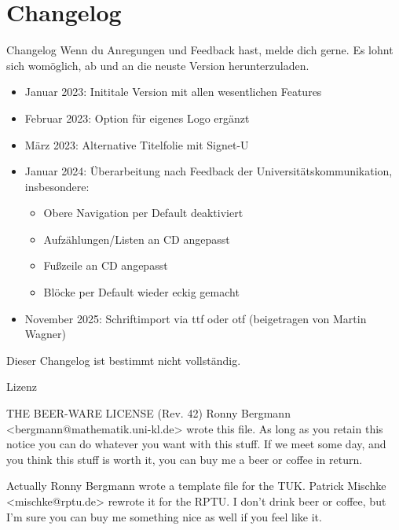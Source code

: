 \documentclass[german,10pt,compress]{beamer}
\begin{document}
\section{Changelog}
\begin{frame}{Changelog}
	Wenn du Anregungen und Feedback hast, melde dich gerne. Es lohnt sich womöglich, ab und an die neuste Version herunterzuladen.
	\begin{itemize}
		\item Januar 2023: Inititale Version mit allen wesentlichen Features
		\item Februar 2023: Option für eigenes Logo ergänzt
		\item März 2023: Alternative Titelfolie mit Signet-U
		\item Januar 2024: Überarbeitung nach Feedback der Universitätskommunikation, insbesondere:
		      \begin{itemize}
			      \item Obere Navigation per Default deaktiviert
			      \item Aufzählungen/Listen an CD angepasst
			      \item Fußzeile an CD angepasst
			      \item Blöcke per Default wieder eckig gemacht
		      \end{itemize}
		\item November 2025: Schriftimport via ttf oder otf (beigetragen von Martin Wagner)
	\end{itemize}
	Dieser Changelog ist bestimmt nicht vollständig.
\end{frame}
\begin{frame}{Lizenz}
	\begin{block}{THE BEER-WARE LICENSE (Rev. 42)}
		Ronny Bergmann <bergmann@mathematik.uni-kl.de> wrote this file. As long as
		you retain this notice you can do whatever you want with this stuff. If we
		meet some day, and you think this stuff is worth it, you can buy me a beer
		or coffee in return.\par\vspace*{1ex}
		Actually Ronny Bergmann wrote a template file for the TUK. Patrick Mischke
		<mischke@rptu.de> rewrote it for the RPTU. I don't drink beer or coffee,
		but I'm sure you can buy me something nice as well if you feel like it.
	\end{block}
\end{frame}
\end{document}
